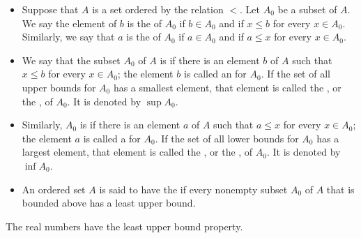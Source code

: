 \begin{definition}
	$ $
	\begin{itemize}
		\item Suppose that $A$ is a set ordered by the relation 
		$<$. Let $A_0$ be a subset of $A$. We say the element of 
		$b$ is the  of 
		$A_0$ if $b \in A_0$ and if $x \leq b$ for every $x \in 
		A_0$. Similarly, we say that $a$ is the  of $A_0$ if $a 
		\in A_0$ 
		and if $a \leq x$ for every $x \in A_0$.
		
		\item We say that the subset $A_0$ of $A$ is  if there is an element 
		$b$ of $A$ such that $x \leq b$ for every $x \in A_0$; 
		the element $b$ is called an  for $A_0$. If the set of all upper bounds for 
		$A_0$ has a smallest element, that element is called the 
		, or 
		the 
		, of $A_0$. It is 
		denoted by 
		$\sup A_0$.
		
		\item Similarly, $A_0$ is  if there is an element 
		$a$ of $A$ such that $a \leq x$ for every $x \in A_0$; 
		the element $a$ is called a  for $A_0$. If the set of all lower bounds for 
		$A_0$ has a largest element, that element is called the 
		, or 
		the , of $A_0$. It is 
		denoted 
		by $\inf A_0$.
		
		\item An ordered set $A$ is said to have the  
		if every nonempty subset $A_0$ of $A$ that is bounded 
		above has a least upper bound.
	\end{itemize}
\end{definition}

The real numbers have the least upper bound property.


























